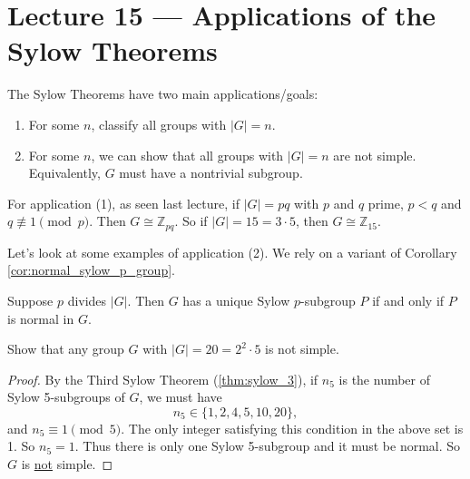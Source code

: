 \section{Lecture 15 — Applications of the Sylow Theorems}

The Sylow Theorems have two main applications/goals:
\begin{enumerate}[label=\textbf{\sffamily\color{main}(\arabic*)}]
	\item For some $n$, classify all groups with $|G|=n$.
	\item For some $n$, we can show that all groups with $|G|=n$ are not simple. Equivalently, $G$ must have a nontrivial subgroup.
\end{enumerate}

\begin{example}
	For application (1), as seen last lecture, if $|G|=pq$ with $p$ and $q$ prime, $p<q$ and $q\not\equiv 1\pmod p$. Then $G\cong\mathbb Z_{pq}$. So if $|G|=15=3\cdot 5$, then $G\cong\mathbb Z_{15}$.
\end{example}

Let's look at some examples of application (2). We rely on a variant of Corollary \ref{cor:normal_sylow_p_group}.
\begin{theorem}
	Suppose $p$ divides $|G|$. Then $G$ has a unique Sylow $p$-subgroup $P$ if and only if $P$ is normal in $G$.
\end{theorem}

\begin{example}
	Show that any group $G$ with $|G|=20=2^2\cdot 5$ is not simple.
	\begin{proof}
		By the Third Sylow Theorem (\ref{thm:sylow_3}), if $n_5$ is the number of Sylow 5-subgroups of $G$, we must have
		$$n_5\in\{1,2,4,5,10,20\},$$
		and $n_5\equiv 1\pmod 5$. The only integer satisfying this condition in the above set is 1. So $n_5=1$. Thus there is only one Sylow 5-subgroup and it must be normal. So $G$ is \underline{not} simple.
	\end{proof}
\end{example}

